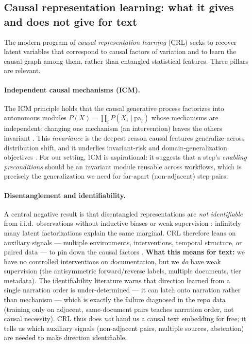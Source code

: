 \subsection{Causal representation learning: what it gives and does not give for text}
\label{sec:crl}

The modern program of \emph{causal representation learning} (CRL)
\citep{found:scholkopf2021causalrl} seeks to recover latent variables that
correspond to causal factors of variation and to learn the causal graph among
them, rather than entangled statistical features. Three pillars are relevant.

\paragraph{Independent causal mechanisms (ICM).}
The ICM principle holds that the causal generative process factorizes into
autonomous modules $P(X)=\prod_i P(X_i\mid \mathrm{pa}_i)$ whose mechanisms are
independent: changing one mechanism (an intervention) leaves the others
invariant \citep{found:peters2017elements,found:scholkopf2021causalrl}. This
\emph{invariance} is the deepest reason causal features generalize across
distribution shift, and it underlies invariant-risk and domain-generalization
objectives \citep{found:arjovsky2019irm,found:gulrajani2021domainbed}. For our
setting, ICM is aspirational: it suggests that a step's \emph{enabling
preconditions} should be an invariant module reusable across workflows, which is
precisely the generalization we need for far-apart (non-adjacent) step pairs.

\paragraph{Disentanglement and identifiability.}
A central negative result is that disentangled representations are
\emph{not identifiable} from i.i.d.\ observations without inductive biases or
weak supervision \citep{found:locatello2019challenging}: infinitely many latent
factorizations explain the same marginal. CRL therefore leans on auxiliary
signals --- multiple environments, interventions, temporal structure, or paired
data --- to pin down the causal factors \citep{found:scholkopf2021causalrl}.
\textbf{What this means for text:} we have no controlled interventions on
documentation, but we \emph{do} have weak supervision (the antisymmetric
forward/reverse labels, multiple documents, tier metadata). The identifiability
literature warns that direction learned from a single narration order is
under-determined --- it can latch onto narration rather than mechanism --- which
is exactly the failure diagnosed in the repo data (training only on adjacent,
same-document pairs teaches narration order, not causal necessity). CRL thus
does \emph{not} hand us a causal text embedding for free; it tells us which
auxiliary signals (non-adjacent pairs, multiple sources, abstention) are needed
to make direction identifiable.

